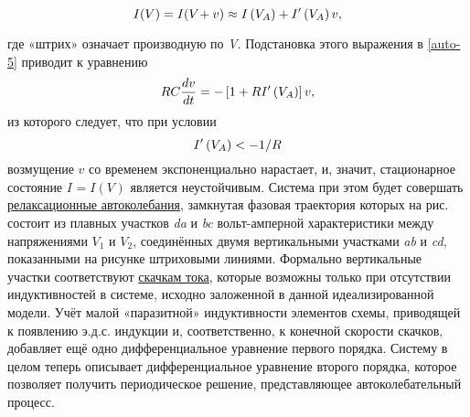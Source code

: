 \begin{equation} 
	\eqmark{auto-7}
	I(V)=I({{V}_{\text{}}}+v)\approx I\left( V_A \right)+{I}'\left( V_A \right)v, 
\end{equation}

где «штрих» означает производную по \emph{V}. Подстановка этого выражения в \eqref{auto-5} приводит к уравнению
\begin{equation} 
	\eqmark{auto-8}
	RC\frac{dv}{dt}=-\left[ 1+R{I}'\left( V_A \right) \right]v, 
\end{equation}
из которого следует, что при условии
\begin{equation} 
	\eqmark{auto-9}
	I'\left( V_A \right) <- {1}/{R}
\end{equation}
возмущение $v$ со временем экспоненциально нарастает, и, значит, стационарное состояние ${{I}_{\text{}}}=I({{V}_{\text{}}})$ является неустойчивым. Система при этом будет совершать \underline{релаксационные автоколебания}, замкнутая фазовая траектория которых на рис.  состоит из плавных участков \emph{da} и \emph{bc} вольт-амперной характеристики между напряжениями $V_1$ и $V_2$, соединённых двумя вертикальными участками \emph{ab} и \emph{cd}, показанными на рисунке штриховыми линиями. Формально вертикальные участки соответствуют \underline{скачкам тока}, которые возможны только при отсутствии индуктивностей в системе, исходно заложенной в данной идеализированной модели. Учёт малой «паразитной» индуктивности элементов схемы, приводящей к появлению э.д.с. индукции и, соответственно, к конечной скорости скачков, добавляет ещё одно дифференциальное уравнение первого порядка. Систему в целом теперь описывает дифференциальное уравнение второго порядка, которое позволяет получить периодическое решение, представляющее автоколебательный процесс.
